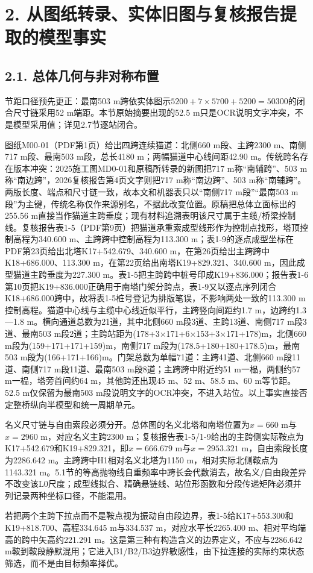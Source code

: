\documentclass[UTF8,a4paper,11pt,fontset=none]{ctexart}
\begin{document}
\section*{2. 从图纸转录、实体旧图与复核报告提取的模型事实}
\subsection*{2.1. 总体几何与非对称布置}
节距口径预先更正：最南503 m跨依实体图示\(5200+7\times5700+5200=50300\)\allowbreak{}的闭合尺寸链采用52 m端距。本节原始摘要出现的52.5 m只是OCR说明文字冲突，不是模型采用值；详见2.7节逐站闭合。\par
图纸M00-01（PDF第1页）给出四跨连续猫道：北侧660 m段、主跨2300 m、南侧717 m段、最南503 m段，总长4180 m；两幅猫道中心线间距42.90 m。传统跨名存在版本冲突：2025施工图MD0-01和原稿所转录的新图把717 m称“南辅跨”、503 m称“南边跨”，2026复核报告第4页文字则把717 m称“南边跨”、503 m称“南辅跨”。两版长度、端点和尺寸链一致，故本文和机器表只以“南侧717 m段”“最南503 m段”为主键，传统名称仅作来源别名，不据此改变位置。原稿把总体立面标出的255.56 m直接当作猫道主跨垂度；现有材料追溯表明该尺寸属于主缆/桥梁控制线。复核报告表1-5（PDF第9页）把猫道承重索成型线形作为控制点找形，塔顶控制高程为340.600 m、主跨跨中控制高程为113.300 m；表1-9的逐点成型坐标在PDF第23页给出北塔K17+542.679、340.600 m，在第26页给出主跨跨中K18+686.000、113.300 m，在第22页给出南塔K19+829.321、340.600 m，因此成型猫道主跨垂度为227.300 m。表1-5把主跨跨中桩号印成K19+836.000；报告表1-6第10页把K19+836.000正确用于南塔门架分跨点，表1-9又以逐点序列闭合K18+686.000跨中，故将表1-5桩号登记为排版笔误，不影响两处一致的113.300 m控制高程。猫道中心线与主缆中心线近似平行，主跨竖向间距约1.7 m，边跨约1.3—1.8 m。横向通道总数为21道，其中北侧660 m段3道、主跨13道、南侧717 m段3道、最南503 m段2道；主跨站距为(178+3×171+6×153+3×171+178)m，北侧660 m段为(159+171+171+159)m，南侧717 m段为(178.5+180+180+178.5)m，最南503 m段为(166+171+166)m。门架总数为单幅71道：主跨41道、北侧660 m段11道、南侧717 m段11道、最南503 m段8道；主跨跨中附近约51 m一榀，两侧约57 m一榀，塔旁首间约64 m，其他跨还出现45 m、52 m、58.5 m、60 m等节距。52.5 m仅保留为最南503 m段说明文字的OCR冲突，不进入站位。以上事实直接否定整桥纵向半模型和统一周期单元。\par
名义尺寸链与自由索段必须分开。总体图的名义北塔和南塔位置为\(x=660\)\allowbreak{} m与\(x=2960\)\allowbreak{} m，对应名义主跨2300 m；复核报告表1-5/1-9给出的主跨侧实际鞍点为K17+542.679和K19+829.321，即\(x=666.679\)\allowbreak{} m与\(x=2953.321\)\allowbreak{} m，自由索段长度为2286.642 m。主跨跨中H1相对名义北塔为1150 m，相对实际北侧鞍点为1143.321 m。5.1节的等高抛物线自重频率中跨长会代数消去，故名义/自由段差异不改变该L0尺度；成型线拟合、精确悬链线、站位形函数和分段传递矩阵必须并列记录两种坐标口径，不能混用。\par
若把两个主跨下拉点而不是鞍点视为振动自由段边界，表1-5给K17+553.300和K19+818.700、高程334.645 m与334.537 m，对应水平长2265.400 m、相对平均端高的跨中矢高约221.291 m。这是第三种有构造含义的边界定义，不应与2286.642 m鞍到鞍段静默混用；它进入B1/B2/B3边界敏感性，由下拉连接的实际约束状态筛选，而不是由目标频率择优。\par
{}
\end{document}
